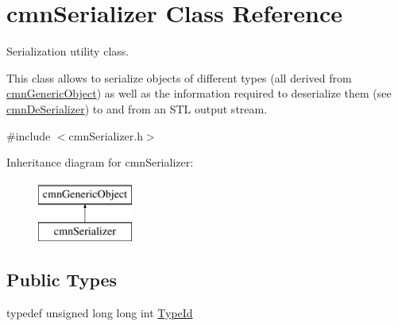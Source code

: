 \hypertarget{classcmn_serializer}{\section{cmn\-Serializer Class Reference}
\label{classcmn_serializer}
}


Serialization utility class.

This class allows to serialize objects of different types (all derived from \hyperlink{classcmn_generic_object}{cmn\-Generic\-Object}) as well as the information required to deserialize them (see \hyperlink{classcmn_de_serializer}{cmn\-De\-Serializer}) to and from an S\-T\-L output stream.  




{\ttfamily \#include $<$cmn\-Serializer.\-h$>$}

Inheritance diagram for cmn\-Serializer\-:\begin{figure}[H]
\begin{center}
\leavevmode
\includegraphics[height=2.000000cm]{d3/dd7/classcmn_serializer}
\end{center}
\end{figure}
\subsection*{Public Types}
\begin{DoxyCompactItemize}
\item 
typedef unsigned long long int \hyperlink{classcmn_serializer_a386606b71d53552842929a1f9b42d45c}{Type\-Id}
\end{DoxyCompactItemize}
